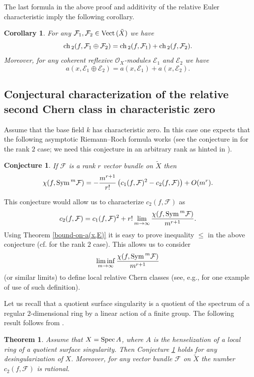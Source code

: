 \documentclass[twoside, 11pt]{article}
\theoremstyle{plain}
\newtheorem{Theorem}[Thm]{\sc Theorem}
\newtheorem{Corollary}[Thm]{\sc Corollary}
\newtheorem{Conjecture}[Thm]{\sc Conjecture}
\theoremstyle{definition}
\theoremstyle{remark}
\newcommand{\cE}{{\mathcal E}}
\newcommand{\cF}{{\mathcal F}}
\newcommand{\cO}{{\mathcal O}}
\newcommand{\ch}{{\mathop{\rm ch \, }}}
\newcommand{\Sym}{{\mathop{{\rm Sym \, }}}}
\newcommand{\Spec}{{\mathop{{\rm Spec\, }}}}
\newcommand{\Vect}{{\mathop{{\rm Vect \,}}}}
\begin{document}
\medskip

The last formula in the above proof and additivity of the relative Euler characteristic imply the following corollary.

\begin{Corollary}\label{a-of-sum-char-p}
For any $\cF_1, \cF_2\in  \Vect (\tilde X)  $ we have
$$\ch_2 (f,\cF _1\oplus \cF_2)=\ch_2 (f,\cF _1)+\ch_2 (f,\cF _2).$$
Moreover, for any coherent reflexive $\cO_X$-modules $\cE_1$ and $\cE_2$ we have
$$a (x,\cE _1\oplus \cE_2)=a (x,\cE _1)+a (x,\cE _2).$$
\end{Corollary}


\subsection{Conjectural characterization of the relative second Chern class in characteristic zero}

Assume that the base field $k$ has characteristic zero. In this case one expects that the following asymptotic Riemann--Roch formula works (see the conjecture in \cite[Introduction]{Wa} for the rank $2$ case;
we need this conjecture in an arbitrary rank as hinted in \cite[Section 8]{La0}).

\begin{Conjecture}\label{Wahl's-conjecture}
If $\cF$ is a rank $r$ vector bundle on $\tilde X$ then
$$\chi (f, \Sym ^m \cF)=-\frac{m^{r+1}}{r!} \left(c_1(f, \cF)^2-c_2(f, \cF) \right) + O(m^r).$$
\end{Conjecture}

This conjecture would allow us to characterize $c_2(f, \cF)$ as
$$c_2 (f, \cF) =  c_1(f, \cF)^2+r! \lim _{m\to \infty} \frac{\chi (f, \Sym ^m \cF  )}{m^{r+1}}.$$
Using Theorem \ref{bound-on-a(x,E)} it is easy to prove inequality $\le$ in the above conjecture
(cf. \cite[Theorem 4.15]{La0} for the rank $2$ case).
This allows us to consider 
$$\liminf _{m\to \infty} \frac{\chi (f, \Sym ^m \cF  )}{m^{r+1}}$$
(or similar limits) to define local relative Chern classes (see, e.g., \cite{La2} for one example of use of such definition).

\medskip


Let us recall that a quotient surface singularity is a quotient of  the spectrum of a regular $2$-dimensional ring
by a linear action of a finite group. The following result follows from \cite[Theorem 5.1]{La0}.

\begin{Theorem}\label{Wahl's-conj-for-quotients}
Assume that $X=\Spec A$, where $A$ is the henselization of a local ring of a quotient surface singularity.  
Then Conjecture \ref{Wahl's-conjecture} holds for any desingularization of $X$. Moreover, for any 
vector bundle $\cF$ on $\tilde X$ the number $c_2(f, \cF)$ is rational.
\end{Theorem}
\end{document}

